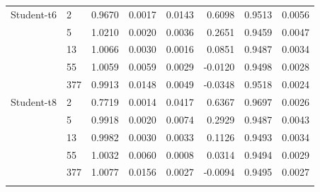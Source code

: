 \begin{longtable}{llrrrrrr}
\addlinespace
Student-t6 & 2 & 0.9670 & 0.0017 & 0.0143 & 0.6098 & 0.9513 & 0.0056 \\
 & 5 & 1.0210 & 0.0020 & 0.0036 & 0.2651 & 0.9459 & 0.0047 \\
 & 13 & 1.0066 & 0.0030 & 0.0016 & 0.0851 & 0.9487 & 0.0034 \\
 & 55 & 1.0059 & 0.0059 & 0.0029 & -0.0120 & 0.9498 & 0.0028 \\
 & 377 & 0.9913 & 0.0148 & 0.0049 & -0.0348 & 0.9518 & 0.0024 \\
\addlinespace
Student-t8 & 2 & 0.7719 & 0.0014 & 0.0417 & 0.6367 & 0.9697 & 0.0026 \\
 & 5 & 0.9918 & 0.0020 & 0.0074 & 0.2929 & 0.9487 & 0.0043 \\
 & 13 & 0.9982 & 0.0030 & 0.0033 & 0.1126 & 0.9493 & 0.0034 \\
 & 55 & 1.0032 & 0.0060 & 0.0008 & 0.0314 & 0.9494 & 0.0029 \\
 & 377 & 1.0077 & 0.0156 & 0.0027 & -0.0094 & 0.9495 & 0.0027 \\
\addlinespace
\bottomrule
\end{longtable}
